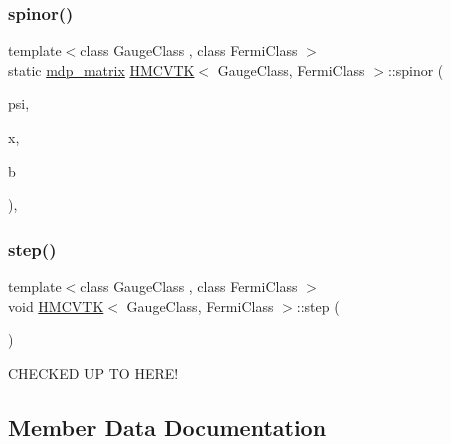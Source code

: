 \mbox{\label{class_h_m_c_v_t_k_a94c7ed3416594292430064dabd62e504}} 
\subsubsection{\texorpdfstring{spinor()}{spinor()}}
{\footnotesize\ttfamily template$<$class Gauge\+Class , class Fermi\+Class $>$ \\
static \hyperlink{classmdp__matrix}{mdp\+\_\+matrix} \hyperlink{class_h_m_c_v_t_k}{H\+M\+C\+V\+TK}$<$ Gauge\+Class, Fermi\+Class $>$\+::spinor (\begin{DoxyParamCaption}\item[{Fermi\+Class \&}]{psi,  }\item[{\hyperlink{classmdp__site}{mdp\+\_\+site}}]{x,  }\item[{int}]{b }\end{DoxyParamCaption})\hspace{0.3cm}{\ttfamily [inline]}, {\ttfamily [static]}}

\mbox{\label{class_h_m_c_v_t_k_a2f14e19e4dd44528d4c62d49b9ca32e4}} 
\subsubsection{\texorpdfstring{step()}{step()}}
{\footnotesize\ttfamily template$<$class Gauge\+Class , class Fermi\+Class $>$ \\
void \hyperlink{class_h_m_c_v_t_k}{H\+M\+C\+V\+TK}$<$ Gauge\+Class, Fermi\+Class $>$\+::step (\begin{DoxyParamCaption}{ }\end{DoxyParamCaption})\hspace{0.3cm}{\ttfamily [inline]}}

C\+H\+E\+C\+K\+ED UP TO H\+E\+R\+E! 

\subsection{Member Data Documentation}
\mbox{\label{class_h_m_c_v_t_k_a113313b896f2ba1cfbb12fab060e30c3}} 
